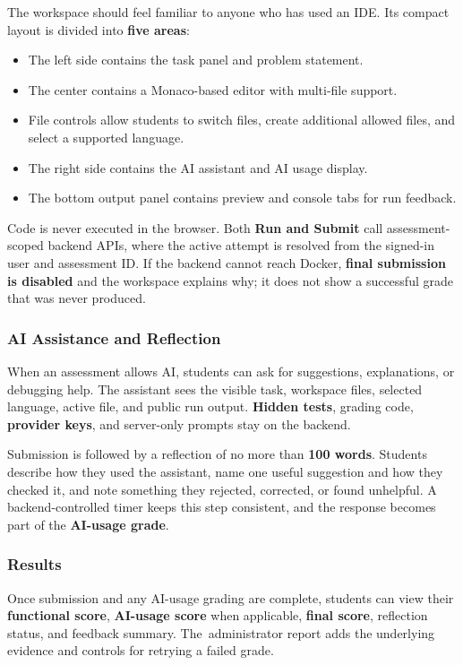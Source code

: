 \documentclass[11pt,a4paper]{article}
\begin{document}
The workspace should feel familiar to anyone who has used an IDE. Its compact layout is divided into \textbf{five areas}:

\begin{itemize}
  \item The left side contains the task panel and problem statement.
  \item The center contains a Monaco-based editor with multi-file support.
  \item File controls allow students to switch files, create additional allowed files, and select a supported language.
  \item The right side contains the AI assistant and AI usage display.
  \item The bottom output panel contains preview and console tabs for run feedback.
\end{itemize}

Code is never executed in the browser. Both \textbf{Run and Submit} call assessment-scoped backend APIs, where the active attempt is resolved from the signed-in user and assessment ID. If the backend cannot reach Docker, \textbf{final submission is disabled} and the workspace explains why; it does not show a successful grade that was never produced.

\subsubsection{AI Assistance and Reflection}

When an assessment allows AI, students can ask for suggestions, explanations, or debugging help. The assistant sees the visible task, workspace files, selected language, active file, and public run output. \textbf{Hidden tests}, grading code, \textbf{provider keys}, and server-only prompts stay on the backend.

Submission is followed by a reflection of no more than \textbf{100 words}. Students describe how they used the assistant, name one useful suggestion and how they checked it, and note something they rejected, corrected, or found unhelpful. A backend-controlled timer keeps this step consistent, and the response becomes part of the \textbf{AI-usage grade}.

\subsubsection{Results}

Once submission and any AI-usage grading are complete, students can view their \textbf{functional score}, \textbf{AI-usage score} when applicable, \textbf{final score}, reflection status, and feedback summary. \mbox{The administrator} report adds the underlying evidence and controls for retrying a failed grade.
\end{document}

